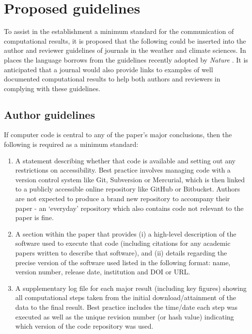 \section{Proposed guidelines}\label{s:guidelines}

To assist in the establishment a minimum standard for the communication of computational results, it is proposed that the following could be inserted into the author and reviewer guidelines of journals in the weather and climate sciences. In places the language borrows from the guidelines recently adopted by \textit{Nature} \citep{Nature2014}. It is anticipated that a journal would also provide links to examples of well documented computational results to help both authors and reviewers in complying with these guidelines.

\subsection{Author guidelines}

If computer code is central to any of the paper's major conclusions, then the following is required as a minimum standard: 
\begin{enumerate}
\item A statement describing whether that code is available and setting out any restrictions on accessibility. Best practice involves managing code with a version control system like Git, Subversion or Mercurial, which is then linked to a publicly accessible online repository like GitHub or Bitbucket. Authors are not expected to produce a brand new repository to accompany their paper - an `everyday' repository which also contains code not relevant to the paper is fine.  
\item A section within the paper that provides (i) a high-level description of the software used to execute that code (including citations for any academic papers written to describe that software), and (ii) details regarding the precise version of the software used listed in the following format: name, version number, release date, institution and DOI or URL.
\item A supplementary log file for each major result (including key figures) showing all computational steps taken from the initial download/attainment of the data to the final result. Best practice includes the time/date each step was executed as well as the unique revision number (or hash value) indicating which version of the code repository was used.
\end{enumerate}

